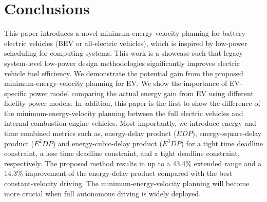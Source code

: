 \documentclass{IEEEtran}
\begin{document}
\section{Conclusions} \label{sec:conclusions}

This paper introduces a novel minimum-energy-velocity planning for battery electric vehicles (BEV or all-electric vehicles), which is inspired by low-power scheduling for computing systems. This work is a showcase such that legacy system-level  low-power design methodologies significantly improves electric vehicle fuel efficiency. We demonstrate the potential gain from the proposed minimum-energy-velocity planning for EV. We show the importance of EV-specific power model  comparing the actual energy gain from EV using different fidelity power models. In addition, this paper is the first to show the difference of the minimum-energy-velocity planning between the full electric vehicles and internal combustion engine vehicles. Most importantly, we introduce energy and time combined metrics such as, energy-delay product ($EDP$), energy-square-delay product ($E^2DP$) and energy-cubic-delay product ($E^3DP$) for a tight time deadline constraint, a lose time deadline constraint, and a tight deadline constraint, respectively. 
The proposed method results in up to a 43.4\% extended range and a  14.3\% improvement of the energy-delay product compared with the best constant-velocity driving. 
The minimum-energy-velocity planning will become more crucial when full autonomous driving is widely deployed.


%




\end{document}
